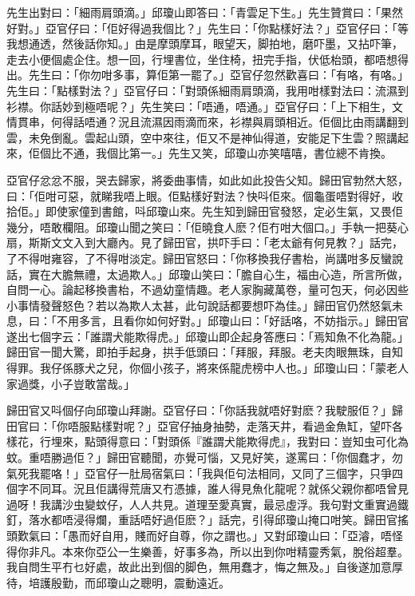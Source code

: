 \documentclass[a5paper, 12pt, openany]{book} %
\begin{document}
	先生出對曰：「細雨肩頭滴。」邱瓊山即答曰：「青雲足下生。」先生贊賞曰：「果然好對。」亞官仔曰：「佢好得過我個比？」先生曰：「你點樣好法？」亞官仔曰：「等我想通透，然後話你知。」由是摩頭摩耳，眼望天，脚拍地，磨吓墨，又拈吓筆，走去小便個處企住。想一回，行埋書位，坐住椅，扭完手指，伏低枱頭，都唔想得出。先生曰：「你勿咁多事，算佢第一罷了。」亞官仔忽然歡喜曰：「有咯，有咯。」先生曰：「點樣對法？」亞官仔曰：「對頭係細雨肩頭滴，我用咁樣對法曰：流濕到衫襟。你話妙到極唔呢？」先生笑曰：「唔通，唔通。」亞官仔曰：「上下相生，文情貫串，何得話唔通？況且流濕因雨滴而來，衫襟與肩頭相近。佢個比由雨講翻到雲，未免倒亂。雲起山頭，空中來往，佢又不是神仙得道，安能足下生雲？照講起來，佢個比不通，我個比第一。」先生又笑，邱瓊山亦笑嘻嘻，書位總不肯換。

	亞官仔忿忿不服，哭去歸家，將委曲事情，如此如此投告父知。歸田官勃然大怒，曰：「佢咁可惡，就睇我唔上眼。佢點樣好對法？快呌佢來。個龜蛋唔對得好，收拾佢。」即使家僮到書館，呌邱瓊山來。先生知到歸田官發怒，定必生氣，又畏佢幾分，唔敢欄阻。邱瓊山聞之笑曰：「佢曉食人麽？佢冇咁大個口。」手執一把葵心扇，斯斯文文入到大廳內。見了歸田官，拱吓手曰：「老太爺有何見教？」話完，了不得咁雍容，了不得咁淡定。歸田官怒曰：「你移換我仔書枱，尚講咁多反蠻說話，實在大膽無禮，太過欺人。」邱瓊山笑曰：「膽自心生，福由心造，所言所做，自問一心。論起移換書枱，不過幼童情趣。老人家胸藏萬卷，量可包天，何必因些小事情發聲怒色？若以為欺人太甚，此句說話都要想吓為佳。」歸田官仍然怒氣未息，曰：「不用多言，且看你如何好對。」邱瓊山曰：「好話咯，不妨指示。」歸田官遂出七個字云：「誰謂犬能欺得虎。」邱瓊山即企起身答應曰：「焉知魚不化為龍。」歸田官一聞大驚，即拍手起身，拱手低頭曰：「拜服，拜服。老夫肉眼無珠，自知得罪。我仔係豚犬之兒，你個小孩子，將來係龍虎榜中人也。」邱瓊山曰：「蒙老人家過獎，小子豈敢當哉。」

	歸田官又呌個仔向邱瓊山拜謝。亞官仔曰：「你話我就唔好對麽？我駛服佢？」歸田官曰：「你唔服點樣對呢？」亞官仔抽身抽勢，走落天井，看過金魚缸，望吓各樣花，行埋來，點頭得意曰：「對頭係『誰謂犬能欺得虎』，我對曰：豈知虫可化為蚊。重唔勝過佢？」歸田官聽聞，亦覺可惱，又見好笑，遂罵曰：「你個蠢才，勿氣死我罷咯！」亞官仔一肚局宿氣曰：「我與佢句法相同，又同了三個字，只爭四個字不同耳。況且佢講得荒唐又冇憑據，誰人得見魚化龍呢？就係父親你都唔曾見過呀！我講沙虫變蚊仔，人人共見。道理至愛真實，最忌虛浮。我句對文重實過鐵釘，落水都唔浸得爛，重話唔好過佢麽？」話完，引得邱瓊山掩口咁笑。歸田官搖頭歎氣曰：「愚而好自用，賤而好自尊，你之謂也。」又對邱瓊山曰：「亞濬，唔怪得你非凡。本來你亞公一生樂善，好事多為，所以出到你咁精靈秀氣，脫俗超羣。我自問生平冇乜好處，故此出到個的脚色，無用蠢才，悔之無及。」自後遂加意厚待，培護殷勤，而邱瓊山之聰明，震動遠近。
\end{document}
